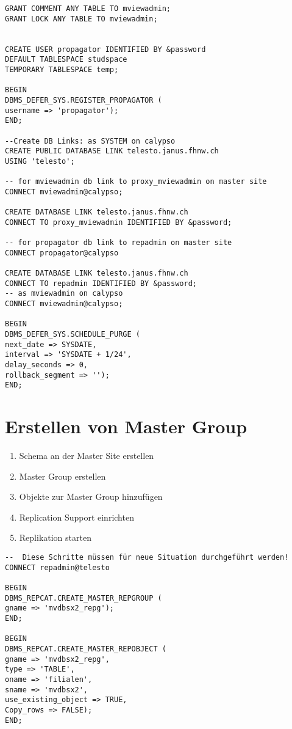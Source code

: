 \documentclass[a4paper,10pt,titlepage=false]{scrreprt}
\begin{document}
\begin{itemize}
\begin{lstlisting}[caption=Setup Materilized View Site (Updateable),style=sql]
GRANT COMMENT ANY TABLE TO mviewadmin;
GRANT LOCK ANY TABLE TO mviewadmin;


CREATE USER propagator IDENTIFIED BY &password
DEFAULT TABLESPACE studspace
TEMPORARY TABLESPACE temp;

BEGIN
DBMS_DEFER_SYS.REGISTER_PROPAGATOR (
username => 'propagator');
END;

--Create DB Links: as SYSTEM on calypso
CREATE PUBLIC DATABASE LINK telesto.janus.fhnw.ch
USING 'telesto';

-- for mviewadmin db link to proxy_mviewadmin on master site
CONNECT mviewadmin@calypso;

CREATE DATABASE LINK telesto.janus.fhnw.ch
CONNECT TO proxy_mviewadmin IDENTIFIED BY &password;

-- for propagator db link to repadmin on master site
CONNECT propagator@calypso

CREATE DATABASE LINK telesto.janus.fhnw.ch
CONNECT TO repadmin IDENTIFIED BY &password;
-- as mviewadmin on calypso
CONNECT mviewadmin@calypso;

BEGIN
DBMS_DEFER_SYS.SCHEDULE_PURGE (
next_date => SYSDATE,
interval => 'SYSDATE + 1/24',
delay_seconds => 0,
rollback_segment => '');
END;  
\end{lstlisting}


\section{Erstellen von Master Group} %
\label{sec:erstellen_von_master_group}
\begin{enumerate}
  \item Schema an der Master Site erstellen
\item Master Group erstellen
\item  Objekte zur Master Group hinzufügen
\item Replication Support einrichten
\item  Replikation starten
\end{enumerate}
\begin{lstlisting}[caption=Erstellen von Master Group,style=sql]
--  Diese Schritte müssen für neue Situation durchgeführt werden!
CONNECT repadmin@telesto

BEGIN
DBMS_REPCAT.CREATE_MASTER_REPGROUP (
gname => 'mvdbsx2_repg');
END;

BEGIN
DBMS_REPCAT.CREATE_MASTER_REPOBJECT (
gname => 'mvdbsx2_repg',
type => 'TABLE',
oname => 'filialen',
sname => 'mvdbsx2',
use_existing_object => TRUE,
Copy_rows => FALSE);
END;


\end{lstlisting}
\end{itemize}
\end{document}
